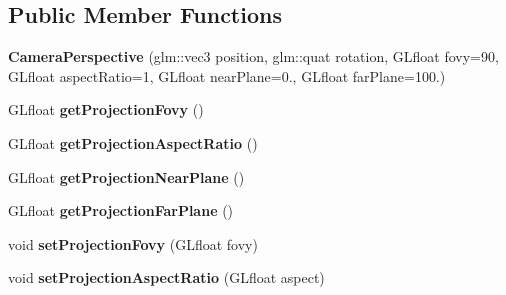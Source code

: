\subsection*{Public Member Functions}
\begin{DoxyCompactItemize}
\item 
\hypertarget{classfillwave_1_1space_1_1CameraPerspective_ae296af21ba0b3a26a48b9e2568de0e15}{}{\bfseries Camera\+Perspective} (glm\+::vec3 position, glm\+::quat rotation, G\+Lfloat fovy=90, G\+Lfloat aspect\+Ratio=1, G\+Lfloat near\+Plane=0., G\+Lfloat far\+Plane=100.)\label{classfillwave_1_1space_1_1CameraPerspective_ae296af21ba0b3a26a48b9e2568de0e15}

\item 
\hypertarget{classfillwave_1_1space_1_1CameraPerspective_a882ea7b48e8cefbf8f5ad636c957da9f}{}G\+Lfloat {\bfseries get\+Projection\+Fovy} ()\label{classfillwave_1_1space_1_1CameraPerspective_a882ea7b48e8cefbf8f5ad636c957da9f}

\item 
\hypertarget{classfillwave_1_1space_1_1CameraPerspective_a0dc1dcacc39c30875a61f43638b851e8}{}G\+Lfloat {\bfseries get\+Projection\+Aspect\+Ratio} ()\label{classfillwave_1_1space_1_1CameraPerspective_a0dc1dcacc39c30875a61f43638b851e8}

\item 
\hypertarget{classfillwave_1_1space_1_1CameraPerspective_adbd7c01df7c7bbc579d02c3213c40b74}{}G\+Lfloat {\bfseries get\+Projection\+Near\+Plane} ()\label{classfillwave_1_1space_1_1CameraPerspective_adbd7c01df7c7bbc579d02c3213c40b74}

\item 
\hypertarget{classfillwave_1_1space_1_1CameraPerspective_af943b9817dd8a2173ab9a59ff1c55592}{}G\+Lfloat {\bfseries get\+Projection\+Far\+Plane} ()\label{classfillwave_1_1space_1_1CameraPerspective_af943b9817dd8a2173ab9a59ff1c55592}

\item 
\hypertarget{classfillwave_1_1space_1_1CameraPerspective_a5bc53d77f61f11ec45879af4e68bd3b2}{}void {\bfseries set\+Projection\+Fovy} (G\+Lfloat fovy)\label{classfillwave_1_1space_1_1CameraPerspective_a5bc53d77f61f11ec45879af4e68bd3b2}

\item 
\hypertarget{classfillwave_1_1space_1_1CameraPerspective_a141fad001ae7ef1946145f8c5b9411cd}{}void {\bfseries set\+Projection\+Aspect\+Ratio} (G\+Lfloat aspect)\label{classfillwave_1_1space_1_1CameraPerspective_a141fad001ae7ef1946145f8c5b9411cd}


\end{DoxyCompactItemize}
